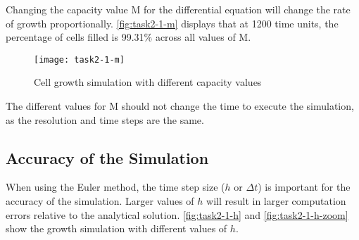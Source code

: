 Changing the capacity value M for the differential equation will change the rate of growth proportionally.
\autoref{fig:task2-1-m} displays that at 1200 time units, the percentage of cells filled is 99.31\% across all values of M.

\begin{figure}[ht]
    \centering
    \texttt{[image: task2-1-m]}
    \caption[Cell growth simulation with different capacity values]{Cell growth simulation with different capacity values}
    \label{fig:task2-1-m}
\end{figure}

The different values for M should not change the time to execute the simulation, as the resolution and time steps are the same.





\subsection{Accuracy of the Simulation}


When using the Euler method, the time step size ($h$ or $\Delta t$) is important for the accuracy of the simulation.
Larger values of $h$ will result in larger computation errors relative to the analytical solution.
\autoref{fig:task2-1-h} and \autoref{fig:task2-1-h-zoom} show the growth  simulation with different values of $h$.

